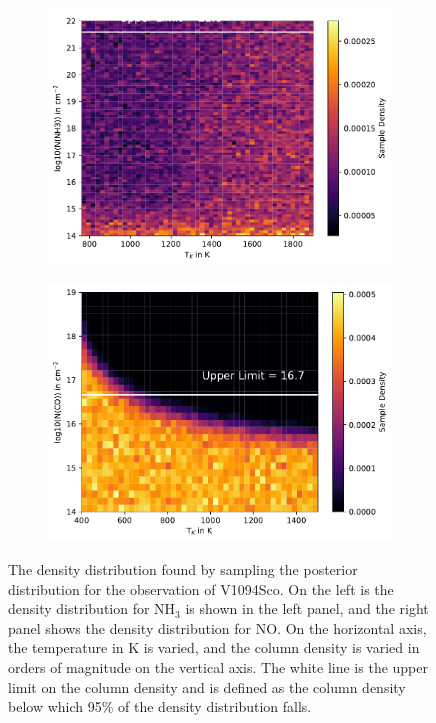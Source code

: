 \documentclass[oneside, single, authoryear, semicolon, 12pt]{lion-msc}
\newcommand{\4}{$_4$}
\newcommand{\3}{$_3$}
\newcommand{\2}{$_2$}
\begin{document}
\begin{figure}[!ht]
    \centering
    \begin{subfigure}[b]{0.49\textwidth}
        \centering
        \includegraphics[width=\textwidth]{radexpy_niels/Radexpy_for_Niels/upper_NH3_V1094Sco.pdf}
    \end{subfigure}
    \hfill
    \begin{subfigure}[b]{0.49\textwidth}
        \centering
        \includegraphics[width=\textwidth]{upper_CO_V1094Sco.pdf}
    \end{subfigure}
    \caption{The density distribution found by sampling the posterior distribution for the observation of V1094Sco. On the left is the density distribution for NH\3 is shown in the left panel, and the right panel shows the density distribution for NO. On the horizontal axis, the temperature in K is varied, and the column density is varied in orders of magnitude on the vertical axis. The white line is the upper limit on the column density and is defined as the column density below which 95\% of the density distribution falls.}
\end{figure}
\end{document}
